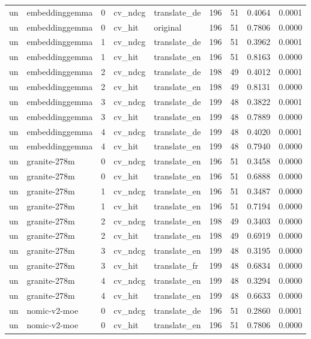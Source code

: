 \begin{tabular}{llrllrrrr}
un & embeddinggemma & 0 & cv\_ndcg & translate\_de & 196 & 51 & 0.4064 & 0.0001 \\
un & embeddinggemma & 0 & cv\_hit & original & 196 & 51 & 0.7806 & 0.0000 \\
un & embeddinggemma & 1 & cv\_ndcg & translate\_de & 196 & 51 & 0.3962 & 0.0001 \\
un & embeddinggemma & 1 & cv\_hit & translate\_en & 196 & 51 & 0.8163 & 0.0000 \\
un & embeddinggemma & 2 & cv\_ndcg & translate\_de & 198 & 49 & 0.4012 & 0.0001 \\
un & embeddinggemma & 2 & cv\_hit & translate\_en & 198 & 49 & 0.8131 & 0.0000 \\
un & embeddinggemma & 3 & cv\_ndcg & translate\_de & 199 & 48 & 0.3822 & 0.0001 \\
un & embeddinggemma & 3 & cv\_hit & translate\_en & 199 & 48 & 0.7889 & 0.0000 \\
un & embeddinggemma & 4 & cv\_ndcg & translate\_de & 199 & 48 & 0.4020 & 0.0001 \\
un & embeddinggemma & 4 & cv\_hit & translate\_en & 199 & 48 & 0.7940 & 0.0000 \\
un & granite-278m & 0 & cv\_ndcg & translate\_en & 196 & 51 & 0.3458 & 0.0000 \\
un & granite-278m & 0 & cv\_hit & translate\_en & 196 & 51 & 0.6888 & 0.0000 \\
un & granite-278m & 1 & cv\_ndcg & translate\_en & 196 & 51 & 0.3487 & 0.0000 \\
un & granite-278m & 1 & cv\_hit & translate\_en & 196 & 51 & 0.7194 & 0.0000 \\
un & granite-278m & 2 & cv\_ndcg & translate\_en & 198 & 49 & 0.3403 & 0.0000 \\
un & granite-278m & 2 & cv\_hit & translate\_en & 198 & 49 & 0.6919 & 0.0000 \\
un & granite-278m & 3 & cv\_ndcg & translate\_en & 199 & 48 & 0.3195 & 0.0000 \\
un & granite-278m & 3 & cv\_hit & translate\_fr & 199 & 48 & 0.6834 & 0.0000 \\
un & granite-278m & 4 & cv\_ndcg & translate\_en & 199 & 48 & 0.3294 & 0.0000 \\
un & granite-278m & 4 & cv\_hit & translate\_en & 199 & 48 & 0.6633 & 0.0000 \\
un & nomic-v2-moe & 0 & cv\_ndcg & translate\_de & 196 & 51 & 0.2860 & 0.0001 \\
un & nomic-v2-moe & 0 & cv\_hit & translate\_en & 196 & 51 & 0.7806 & 0.0000 \\

\end{tabular}
